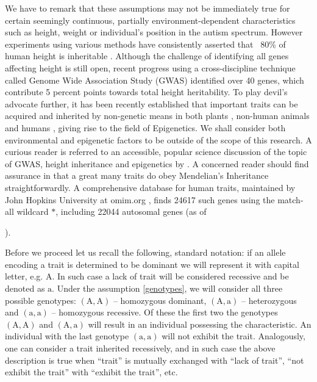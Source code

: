 \documentclass{l4proj}
\newcommand{\genotype}[2]{\ensuremath{(\mathrm{#1}, \mathrm{#2})}}
\begin{document}
We have to remark that these assumptions may not be immediately true for certain seemingly continuous, partially environment-dependent characteristics such as height, weight or individual's position in the autism spectrum. However experiments using various methods have consistently asserted that ~80\% of human height is inheritable \parencite{heightTwins, heightJustSiblings}. Although the challenge of identifying all genes affecting height is still open, recent progress using a cross-discipline technique called Genome Wide Association Study (GWAS) identified over 40 genes, which contribute 5 percent points towards total height heritability. To play devil's advocate further, it has been recently established that important traits can be acquired and inherited by non-genetic means in both plants \parencite{palmOilKernel}, non-human animals \parencite{dolinoy_maternal_2007} and humans \parencite{yehuda_holocaust_2015}, giving rise to the field of Epigenetics. We shall consider both environmental and epigenetic factors to be outside of the scope of this research. A curious reader is referred to an accessible, popular science discussion of the topic of GWAS, height inheritance and epigenetics by \textcite{GWASDiscussion}. A concerned reader should find assurance in that a great many traits do obey Mendelian's Inheritance straightforwardly. A comprehensive database for human traits, maintained by John Hopkins University at omim.org \parencite{omim16}, finds 24617 such genes using the match-all wildcard $*$, including 22044 \gls{autosomal} genes (as of \date{March 13, 2016}).

Before we proceed let us recall the following, standard notation: if an \gls{allele} encoding a trait is determined to be \gls{dominant} we will represent it with capital letter, e.g. $\mathrm{A}$. In such case a lack of trait will be considered \gls{recessive} and be denoted as $\mathrm{a}$. Under the assumption \ref{genotypes}, we will consider all three possible genotypes: \genotype{A}{A} -- homozygous dominant, \genotype{A}{a} -- heterozygous and \genotype{a}{a} -- homozygous recessive. Of these the first two the genotypes \genotype{A}{A} and \genotype{A}{a} will result in an individual possessing the characteristic. An individual with the last genotype \genotype{a}{a} will not exhibit the trait. Analogously, one can consider a trait inherited recessively, and in such case the above description is true when ``trait'' is mutually exchanged with ``lack of trait'', ``not exhibit the trait'' with ``exhibit the trait'', etc.
\end{document}
